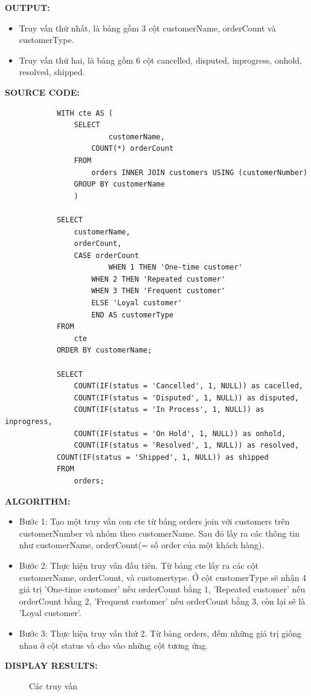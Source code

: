 \documentclass[12pt,a4paper]{report}
\begin{document}
	{\bf OUTPUT:}
	\begin{itemize}
		\item Truy vấn thứ nhất, là bảng gồm 3 cột customerName, orderCount và customerType.
		\item Truy vấn thứ hai, là bảng gồm 6 cột cancelled, disputed, inprogress, onhold, resolved, shipped.
	\end{itemize}
	{\bf SOURCE CODE:}
		\begin{lstlisting}
			WITH cte AS (
				SELECT
						customerName,
            		COUNT(*) orderCount
				FROM 
					orders INNER JOIN customers USING (customerNumber)
				GROUP BY customerName
				)

			SELECT
				customerName,
    			orderCount,
    			CASE orderCount
						WHEN 1 THEN 'One-time customer'
            		WHEN 2 THEN 'Repeated customer'
            		WHEN 3 THEN 'Frequent customer'
            		ELSE 'Loyal customer'
            		END AS customerType
			FROM 
				cte
			ORDER BY customerName;

			SELECT
				COUNT(IF(status = 'Cancelled', 1, NULL)) as cacelled,
    			COUNT(IF(status = 'Disputed', 1, NULL)) as disputed,
    			COUNT(IF(status = 'In Process', 1, NULL)) as inprogress,
    			COUNT(IF(status = 'On Hold', 1, NULL)) as onhold,
    			COUNT(IF(status = 'Resolved', 1, NULL)) as resolved,
   			COUNT(IF(status = 'Shipped', 1, NULL)) as shipped
			FROM 
				orders;
		\end{lstlisting}
	
	{\bf ALGORITHM:}
	\begin{itemize}
		\item Bước 1: Tạo một truy vấn con cte từ bảng orders join với customers trên customerNumber và nhóm theo customerName. Sau đó lấy ra các thông tin như customerName, orderCount(= số order của một khách hàng).
		\item Bước 2: Thực hiện truy vấn đầu tiên. Từ bảng cte lấy ra các cột customerName, orderCount, và customertype. Ở cột customerType sẽ nhận 4 giá trị 'One-time customer' nếu orderCount bằng 1, 'Repeated customer' nếu orderCount bằng 2, 'Frequent customer' nếu orderCount bằng 3, còn lại sẽ là 'Loyal customer'.
		\item Bước 3: Thực hiện truy vấn thứ 2. Từ bảng orders, đếm những giá trị giống nhau ở cột status và cho vào những cột tương ứng.
	\end{itemize}
	
	{\bf DISPLAY RESULTS:}
		\begin{figure}[h]
		\hfill
		\hfill
		\caption{Các truy vấn}
		\end{figure}
\end{document}
